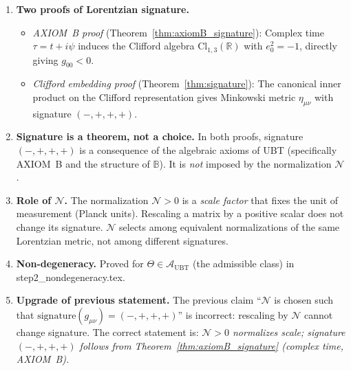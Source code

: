 \documentclass[12pt]{article}
\theoremstyle{definition}
\theoremstyle{remark}
\begin{document}
\begin{enumerate}
  \item \textbf{Two proofs of Lorentzian signature.}
        \begin{itemize}
          \item \emph{AXIOM~B proof} (Theorem~\ref{thm:axiomB_signature}): Complex time
                $\tau = t + i\psi$ induces the Clifford algebra $\mathrm{Cl}_{1,3}(\mathbb{R})$
                with $e_0^2 = -1$, directly giving $g_{00} < 0$.
          \item \emph{Clifford embedding proof} (Theorem~\ref{thm:signature}): The canonical
                inner product on the Clifford representation gives Minkowski metric
                $\eta_{\mu\nu}$ with signature $(-,+,+,+)$.
        \end{itemize}
  \item \textbf{Signature is a theorem, not a choice.}
        In both proofs, signature $(-,+,+,+)$ is a consequence of the algebraic axioms
        of UBT (specifically AXIOM~B and the structure of $\mathbb{B}$).
        It is \emph{not} imposed by the normalization $\mathcal{N}$.
  \item \textbf{Role of $\mathcal{N}$.}
        The normalization $\mathcal{N} > 0$ is a \emph{scale factor} that fixes the
        unit of measurement (Planck units).  Rescaling a matrix by a positive scalar
        does not change its signature.  $\mathcal{N}$ selects among equivalent
        normalizations of the same Lorentzian metric, not among different signatures.
  \item \textbf{Non-degeneracy.}
        Proved for $\Theta\in\mathcal{A}_{\mathrm{UBT}}$ (the admissible class) in
        step2\_nondegeneracy.tex.
  \item \textbf{Upgrade of previous statement.}
        The previous claim ``$\mathcal{N}$ is chosen such that
        $\mathrm{signature}(g_{\mu\nu}) = (-,+,+,+)$'' is incorrect: rescaling by
        $\mathcal{N}$ cannot change signature.  The correct statement is:
        \emph{$\mathcal{N}>0$ normalizes scale; signature $(-,+,+,+)$ follows from
        Theorem~\ref{thm:axiomB_signature} (complex time, AXIOM~B).}
\end{enumerate}

\ifdefined\INCLUDEMODE
\else
  
\end{document}
